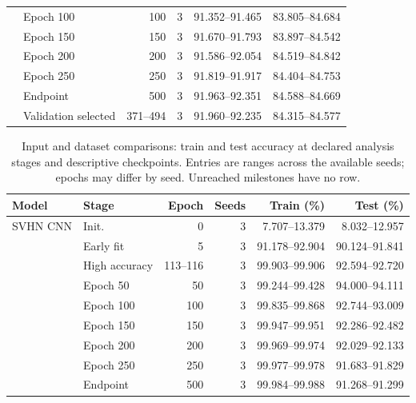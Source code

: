 \begin{table}[!htbp]
\begin{tabular}{llrrrr}
 & Epoch 100 & 100 & 3 & 91.352--91.465 & 83.805--84.684\\
 & Epoch 150 & 150 & 3 & 91.670--91.793 & 83.897--84.542\\
 & Epoch 200 & 200 & 3 & 91.586--92.054 & 84.519--84.842\\
 & Epoch 250 & 250 & 3 & 91.819--91.917 & 84.404--84.753\\
 & Endpoint & 500 & 3 & 91.963--92.351 & 84.588--84.669\\
 & Validation selected & 371--494 & 3 & 91.960--92.235 & 84.315--84.577\\
\bottomrule\end{tabular}\end{table}

\FloatBarrier
\begin{table}[!htbp]\centering
\caption{Input and dataset comparisons: train and test accuracy at declared analysis stages and descriptive checkpoints. Entries are ranges across the available seeds; epochs may differ by seed. Unreached milestones have no row.}\label{tab:perf-3-3}
\small\setlength{\tabcolsep}{4pt}
\begin{tabular}{llrrrr}\toprule
Model & Stage & Epoch & Seeds & Train (\%) & Test (\%)\\\midrule
SVHN CNN & Init. & 0 & 3 & 7.707--13.379 & 8.032--12.957\\
 & Early fit & 5 & 3 & 91.178--92.904 & 90.124--91.841\\
 & High accuracy & 113--116 & 3 & 99.903--99.906 & 92.594--92.720\\
 & Epoch 50 & 50 & 3 & 99.244--99.428 & 94.000--94.111\\
 & Epoch 100 & 100 & 3 & 99.835--99.868 & 92.744--93.009\\
 & Epoch 150 & 150 & 3 & 99.947--99.951 & 92.286--92.482\\
 & Epoch 200 & 200 & 3 & 99.969--99.974 & 92.029--92.133\\
 & Epoch 250 & 250 & 3 & 99.977--99.978 & 91.683--91.829\\
 & Endpoint & 500 & 3 & 99.984--99.988 & 91.268--91.299\\
\bottomrule\end{tabular}\end{table}

